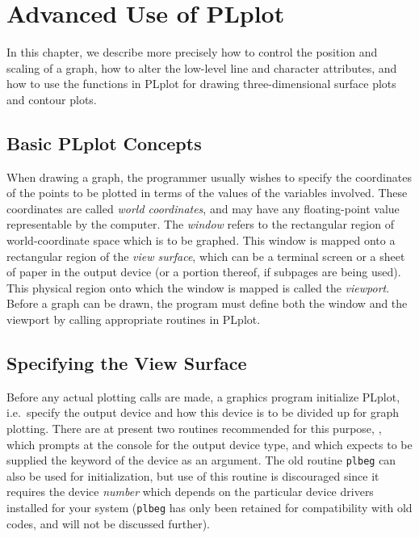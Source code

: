 
\chapter {Advanced Use of PLplot}\label{advanced}

In this chapter, we describe more precisely how to control the position
and scaling of a graph, how to alter the low-level line and character
attributes, and how to use the functions in PLplot for drawing
three-dimensional surface plots and contour plots.


\section {Basic PLplot Concepts}

When drawing a graph, the programmer usually wishes to specify the
coordinates of the points to be plotted in terms of the values of the
variables involved. These coordinates are called {\em world coordinates}, 
and may have any floating-point value representable by the computer. The
{\em window\/} refers to the rectangular region of world-coordinate space
which is to be graphed. This window is mapped onto a rectangular region of
the {\em view surface}, which can be a terminal screen or a sheet of paper
in the output device (or a portion thereof, if subpages are being used).
This physical region onto which the window is mapped is called the {\em
viewport}. Before a graph can be drawn, the program must define both the
window and the viewport by calling appropriate routines in PLplot. 


\section {Specifying the View Surface}

Before any actual plotting calls are made, a graphics program initialize
PLplot, i.e.~specify the output device and how this device is to be divided
up for graph plotting.  There are at present two routines recommended for
this purpose, , which prompts at the console for the output
device type, and  which expects to be supplied the keyword of
the device as an argument.  The old routine {\tt plbeg} can also be used for
initialization, but use of this routine is discouraged since it requires the
device {\em number\/} which depends on the particular device drivers installed
for your system ({\tt plbeg} has only been retained for compatibility with
old codes, and will not be discussed further).

